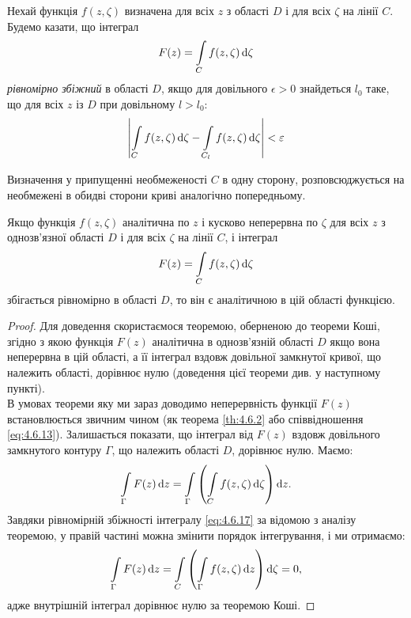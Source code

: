 Нехай функція $f(z, \zeta)$ визначена для всіх $z$ з області $D$ і для всіх $\zeta$ на лінії $C$. Будемо казати, що інтеграл
\begin{equation}
	\label{eq:4.6.15}
	F(z) = \displaystyle\int\limits_C f(z, \zeta) \mathop{}\!\mathrm{d} \zeta
\end{equation}
\textit{рівномірно збіжний} в області $D$, якщо для довільного $\epsilon > 0$ знайдеться $l_0$ таке, що для всіх $z$ із $D$ при довільному $l > l_0$:
\begin{equation}
	\label{eq:4.6.16}
	\left| \displaystyle\int\limits_C f(z, \zeta) \mathop{}\!\mathrm{d} \zeta - \displaystyle\int\limits_{C_l} f(z, \zeta) \mathop{}\!\mathrm{d} \zeta \right| < \varepsilon
\end{equation}
\begin{remark*}
Визначення у припущенні необмеженості $C$ в одну сторону, розповсюджується на необмежені в обидві сторони криві аналогічно попередньому.
\end{remark*}

\begin{theorem}
\label{th:4.6.4}
Якщо функція $f(z, \zeta)$ аналітична по $z$ і кусково неперервна по $\zeta$ для всіх $z$ з однозв'язної області $D$ і для всіх $\zeta$ на лінії $C$, і інтеграл
\begin{equation}
	\label{eq:4.6.17}
	F(z) = \displaystyle\int\limits_C f(z, \zeta) \mathop{}\!\mathrm{d} \zeta
\end{equation}
збігається рівномірно в області $D$, то він є аналітичною в цій області функцією.
\end{theorem}

\begin{proof}
Для доведення скористаємося теоремою, оберненою до теореми Коші, згідно з якою функція $F(z)$ аналітична в однозв'язній області $D$ якщо вона неперервна в цій області, а її інтеграл вздовж довільної замкнутої кривої, що належить області, дорівнює нулю (доведення цієї теореми див. у наступному пункті). \\

В умовах теореми яку ми зараз доводимо неперервність функції $F(z)$ встановлюється звичним чином (як теорема \ref{th:4.6.2} або співвідношення \eqref{eq:4.6.13}). Залишається показати, що інтеграл від $F(z)$ вздовж довільного замкнутого контуру $\Gamma$, що належить області $D$, дорівнює нулю. Маємо:
\begin{equation}
	\label{eq:4.6.18}
	\displaystyle\int\limits_\Gamma F(z) \mathop{}\!\mathrm{d} z = \displaystyle\int\limits_\Gamma \left( \displaystyle\int\limits_C f(z, \zeta) \mathop{}\!\mathrm{d} \zeta \right) \mathop{}\!\mathrm{d} z.
\end{equation}
Завдяки рівномірній збіжності інтегралу \eqref{eq:4.6.17} за відомою з аналізу теоремою, у правій частині можна змінити порядок інтегрування, і ми отримаємо:
\begin{equation}
	\label{eq:4.6.19}
	\displaystyle\int\limits_\Gamma F(z) \mathop{}\!\mathrm{d} z = \displaystyle\int\limits_C \left( \displaystyle\int\limits_\Gamma f(z, \zeta) \mathop{}\!\mathrm{d} z \right) \mathop{}\!\mathrm{d} \zeta = 0,
\end{equation}
адже внутрішній інтеграл дорівнює нулю за теоремою Коші.
\end{proof}

